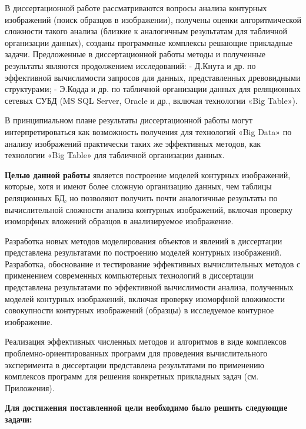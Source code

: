 В диссертационной работе рассматриваются вопросы анализа контурных изображений (поиск образцов в изображении), получены оценки алгоритмической сложности такого анализа (близкие к аналогичным результатам для табличной организации данных), созданы программные комплексы решающие прикладные задачи.
Предложенные в  диссертационной работы методы и полученные результаты являются продолжением исследований: 
- Д.Кнута и др. по эффективной вычислимости запросов для данных, представленных древовидными структурами;
- Э.Кодда и др. по табличной организации данных для реляционных сетевых СУБД (MS SQL Server, Oracle и др., включая технологии «Big Table»).

В принципиальном плане результаты диссертационной работы могут интерпретироваться как возможность получения для технологий «Big Data» по анализу изображений практически таких же эффективных методов, как  технологии  «Big Table» для табличной организации данных.

\textbf{Целью данной работы} является построение  моделей контурных изображений, которые, хотя и имеют более сложную организацию данных, чем  таблицы реляционных БД, но позволяют получить почти аналогичные результаты по вычислительной сложности  анализа контурных изображений, включая проверку изоморфных вложений образцов в анализируемое изображение.

Разработка новых  методов моделирования объектов и явлений  в диссертации представлена результатами по построению  моделей контурных изображений.
Разработка, обоснование и тестирование эффективных вычислительных методов с применением современных компьютерных технологий в диссертации представлена результатами по эффективной вычислимости анализа, полученных  моделей контурных изображений, включая проверку изоморфной вложимости совокупности контурных изображений (образцы) в исследуемое контурное изображение.

Реализация эффективных численных методов и алгоритмов в виде комплексов проблемно-ориентированных программ для проведения вычислительного эксперимента в диссертации представлена результатами по применению комплексов программ для решения конкретных прикладных задач  (см. Приложения).


\textbf{Для достижения поставленной цели необходимо было решить следующие задачи:}

